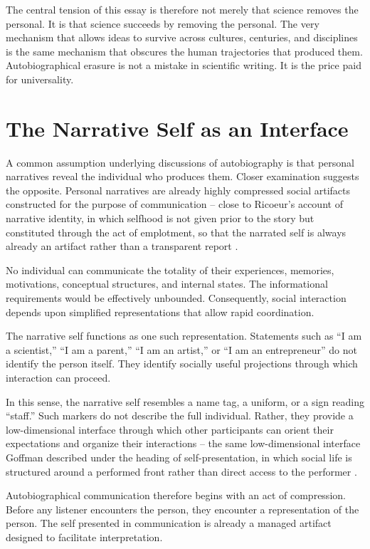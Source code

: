 \documentclass[11pt]{article}
\theoremstyle{plain}
\begin{document}
The central tension of this essay is therefore not merely that science removes the personal. It is that science succeeds by removing the personal. The very mechanism that allows ideas to survive across cultures, centuries, and disciplines is the same mechanism that obscures the human trajectories that produced them. Autobiographical erasure is not a mistake in scientific writing. It is the price paid for universality.

\section{The Narrative Self as an Interface}

A common assumption underlying discussions of autobiography is that personal narratives reveal the individual who produces them. Closer examination suggests the opposite. Personal narratives are already highly compressed social artifacts constructed for the purpose of communication -- close to Ricoeur's account of narrative identity, in which selfhood is not given prior to the story but constituted through the act of emplotment, so that the narrated self is always already an artifact rather than a transparent report \cite{ricoeur1992}.

No individual can communicate the totality of their experiences, memories, motivations, conceptual structures, and internal states. The informational requirements would be effectively unbounded. Consequently, social interaction depends upon simplified representations that allow rapid coordination.

The narrative self functions as one such representation. Statements such as ``I am a scientist,'' ``I am a parent,'' ``I am an artist,'' or ``I am an entrepreneur'' do not identify the person itself. They identify socially useful projections through which interaction can proceed.

In this sense, the narrative self resembles a name tag, a uniform, or a sign reading ``staff.'' Such markers do not describe the full individual. Rather, they provide a low-dimensional interface through which other participants can orient their expectations and organize their interactions -- the same low-dimensional interface Goffman described under the heading of self-presentation, in which social life is structured around a performed front rather than direct access to the performer \cite{goffman1959}.

Autobiographical communication therefore begins with an act of compression. Before any listener encounters the person, they encounter a representation of the person. The self presented in communication is already a managed artifact designed to facilitate interpretation.
\end{document}
